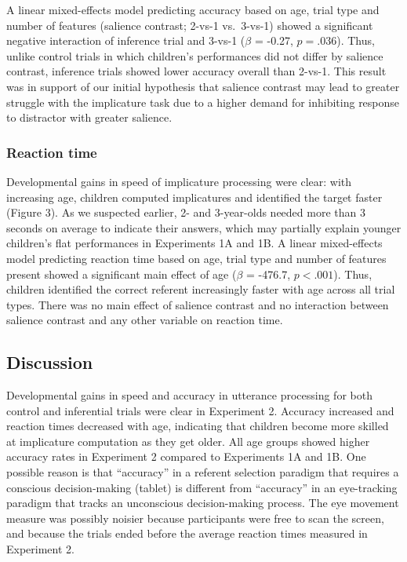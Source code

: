 \documentclass[a4paper,man,apacite,floatsintext]{apa6}
\begin{document}
A linear mixed-effects model predicting accuracy based on age, trial
type and number of features (salience contrast; 2-vs-1 vs.~3-vs-1)
showed a significant negative interaction of inference trial and 3-vs-1
(\(\beta\) = -0.27, \(p = .036\)). Thus, unlike control trials in which
children's performances did not differ by salience contrast, inference
trials showed lower accuracy overall than 2-vs-1. This result was in
support of our initial hypothesis that salience contrast may lead to
greater struggle with the implicature task due to a higher demand for
inhibiting response to distractor with greater salience.

\subsubsection{Reaction time}\label{reaction-time}

Developmental gains in speed of implicature processing were clear: with
increasing age, children computed implicatures and identified the target
faster (Figure 3). As we suspected earlier, 2- and 3-year-olds needed
more than 3 seconds on average to indicate their answers, which may
partially explain younger children's flat performances in Experiments 1A
and 1B. A linear mixed-effects model predicting reaction time based on
age, trial type and number of features present showed a significant main
effect of age (\(\beta\) = -476.7, \(p < .001\)). Thus, children
identified the correct referent increasingly faster with age across all
trial types. There was no main effect of salience contrast and no
interaction between salience contrast and any other variable on reaction
time.

\subsection{Discussion}\label{discussion-2}

Developmental gains in speed and accuracy in utterance processing for
both control and inferential trials were clear in Experiment 2. Accuracy
increased and reaction times decreased with age, indicating that
children become more skilled at implicature computation as they get
older. All age groups showed higher accuracy rates in Experiment 2
compared to Experiments 1A and 1B. One possible reason is that
``accuracy'' in a referent selection paradigm that requires a conscious
decision-making (tablet) is different from ``accuracy'' in an
eye-tracking paradigm that tracks an unconscious decision-making
process. The eye movement measure was possibly noisier because
participants were free to scan the screen, and because the trials ended
before the average reaction times measured in Experiment 2.
\end{document}
